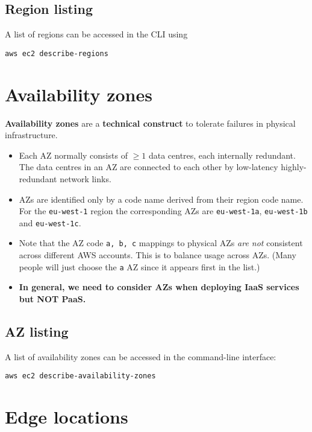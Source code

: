 \subsection{Region listing}
A list of regions can be accessed in the CLI using
\begin{verbatim}
aws ec2 describe-regions
\end{verbatim}


\section{Availability zones}
\label{sec:availability-zones}

\textbf{Availability zones} are a \textbf{technical construct} to tolerate failures in physical
infrastructure.

\begin{itemize}
\item
  Each AZ normally consists of \(\ge 1\) data centres, each internally
  redundant. The data centres in an AZ are connected to each other by
  low-latency highly-redundant network links.
\item
  AZs are identified only by a code name derived from their region code
  name. For the \texttt{eu-west-1} region the corresponding AZs are
  \texttt{eu-west-1a}, \texttt{eu-west-1b} and \texttt{eu-west-1c}.
\item
  Note that the AZ code \texttt{a,\ b,\ c} mappings to physical AZs
  \emph{are not} consistent across different AWS accounts. This is to
  balance usage across AZs. (Many people will just choose the \texttt{a}
  AZ since it appears first in the list.)
\item
  \textbf{In general, we need to consider AZs when deploying IaaS
  services but NOT PaaS.}
\end{itemize}

\subsection{AZ listing}

A list of availability zones can be accessed in the command-line interface:
\begin{verbatim}
aws ec2 describe-availability-zones
\end{verbatim}

\section{Edge locations}
\label{sec:edge-locations}

